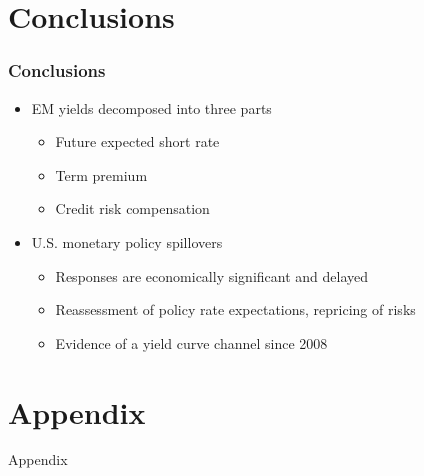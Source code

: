 \documentclass[12pt, aspectratio=169, xcolor=dvipsnames]{beamer}  %
\begin{document}
\section{Conclusions}

\begin{frame}
	\frametitle{Conclusions}
	\begin{itemize}
		\item EM yields decomposed into three parts
		\begin{itemize}
			\item Future expected short rate
			\item Term premium
			\item Credit risk compensation
		\end{itemize}
		\item U.S. monetary policy spillovers
		\begin{itemize}
			\item Responses are economically significant and delayed
			\item Reassessment of policy rate expectations, repricing of risks
			\item Evidence of a yield curve channel since 2008
		\end{itemize}
	\end{itemize}
\end{frame}


\section{Appendix}

\begin{frame}
	\begin{center}
		\huge \textcolor{yaleblue}{Appendix}
	\end{center}
\end{frame}
\end{document}
